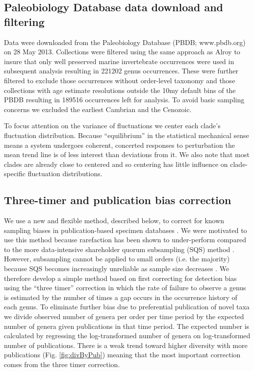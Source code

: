 \documentclass[12pt]{article}
\let\citep=\autocite
\begin{document}
\subsection{Paleobiology Database data download and filtering}
Data were downloaded from the Paleobiology Database (PBDB;
www.pbdb.org) on 28 May 2013. Collections were filtered using the same
approach as Alroy \citep{alroy08} to insure that only well preserved
marine invertebrate occurrences were used in subsequent analysis
resulting in 221202 genus occurrences. These were further filtered to
exclude those occurrences without order-level taxonomy and those
collections with age estimate resolutions outside the 10my default
bins of the PBDB resulting in 189516 occurrences left for analysis. To
avoid basic sampling concerns we excluded the earliest Cambrian and
the Cenozoic.

To focus attention on the variance of fluctuations we center each
clade's fluctuation distribution. Because ``equilibrium'' in the
statistical mechanical sense means a system undergoes coherent,
concerted responses to perturbation the mean trend line is of less
interest than deviations from it. We also note that most clades are
already close to centered and so centering has little influence on
clade-specific fluctuation distributions.

\subsection{Three-timer and publication bias correction} 
\label{sec:3TP}
We use a new and flexible method, described below, to correct for
known sampling biases in publication-based specimen databases
\citep{alroy08, alroy2010}.  We were motivated to use this method
because rarefaction has been shown to under-perform compared to the
more data-intensive shareholder quorum subsampling (SQS) method
\citep{alroy2010}.  However, subsampling cannot be applied to small
orders (i.e. the majority) because SQS becomes increasingly unreliable
as sample size decreases \citep{alroy2010}.  We therefore develop a
simple method based on first correcting for detection bias using the
``three timer'' correction \citep{alroy08} in which the rate of failure
to observe a genus is estimated by the number of times a gap occurs in
the occurrence history of each genus. To eliminate further bias due to
preferential publication of novel taxa we divide observed number of
genera per order per time period by the expected number of genera
given publications in that time period.  The expected number is
calculated by regressing the log-transformed number of genera on
log-transformed number of publications. There is a weak trend toward
higher diversity with more publications (Fig. \ref{fig:divByPub})
meaning that the most important correction comes from the three timer
correction.
\end{document}
